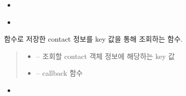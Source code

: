 \documentclass[a4paper,10pt,english]{sphinxmanual}
\begin{document}
\begin{fulllineitems}
\begin{fulllineitems}
\begin{quote}
\begin{description}
\begin{itemize}
\end{itemize}

\end{description}\end{quote}


\nopagebreak

\begin{itemize}
\item {} 
\sphinxAtStartPar
{\hyperref[\detokenize{_DHSearch:DHSearch._dhDaemonListener}]{}}

\item {} 
\sphinxAtStartPar
{\hyperref[\detokenize{_DHSearch:DHSearch._deleteMyInfoFromKademlia}]{}}

\end{itemize}



\end{fulllineitems}


\begin{fulllineitems}
\label{\detokenize{_kademlia:KNode.get}}
\pysigstartsignatures
{}
\pysigstopsignatures
\sphinxAtStartPar
{} 함수로 저장한 contact 정보를 key 값을 통해 조회하는 함수.
\begin{quote}\begin{description}
\begin{itemize}
\item {} 
\sphinxAtStartPar
{} – 조회할 contact 객체 정보에 해당하는 key 값

\item {} 
\sphinxAtStartPar
{} – callback 함수

\end{itemize}

\end{description}\end{quote}


\nopagebreak

\begin{itemize}
\item {} 
\sphinxAtStartPar
{\hyperref[\detokenize{_kademlia:KNode._iterativeFindValue}]{}}


\end{itemize}
\end{fulllineitems}
\end{fulllineitems}
\end{document}
